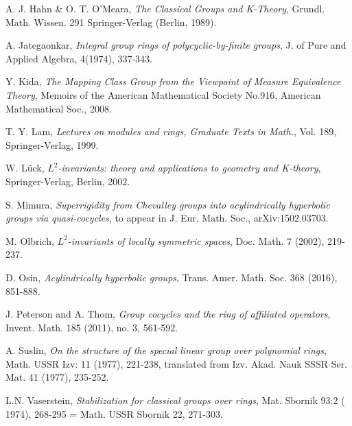 \documentclass{gtpart}     %
\begin{document}
\begin{thebibliography}{99}
 A. J. Hahn \& O. T. O'Meara, \textit{The Classical Groups and
K-Theory}, Grundl. Math. Wissen. 291 Springer-Verlag (Berlin, 1989).

 A. Jategaonkar, \textit{Integral group rings of
polycyclic-by-finite groups}, J. of Pure and Applied Algebra, 4(1974),
337-343.

 Y. Kida, \textit{The Mapping Class Group from the Viewpoint of
Measure Equivalence Theory}, Memoirs of the American Mathematical Society
No.916, American Mathematical Soc., 2008.

 T. Y. Lam, \textit{Lectures on modules and rings, Graduate
Texts in Math.}, Vol. 189, Springer-Verlag, 1999.

 W. L\"{u}ck, $L^{2}$\textit{-invariants: theory and
applications to geometry and K-theory}, Springer-Verlag, Berlin, 2002.

 S. Mimura, \textit{Superrigidity from Chevalley groups into
acylindrically hyperbolic groups via quasi-cocycles}, to appear in J. Eur.
Math. Soc., arXiv:1502.03703.

 M. Olbrich, $L^{2}$\textit{-invariants of locally symmetric
spaces}, Doc. Math. 7 (2002), 219-237.

 D. Osin, \textit{Acylindrically hyperbolic groups}, Trans.
Amer. Math. Soc. 368 (2016), 851-888.

 J. Peterson and A. Thom, \textit{Group cocycles and the ring of
affiliated operators}, Invent. Math. 185 (2011), no. 3, 561-592.

 A. Suslin, \textit{On the structure of the special linear group
over polynomial rings}, Math. USSR Izv: 11 (1977), 221-238, translated from
Izv. Akad. Nauk SSSR Ser. Mat. 41 (1977), 235-252.

 L.N. Vaserstein, \textit{Stabilization for classical groups
over rings}, Mat. Sbornik 93:2 ( 1974), 268-295 = Math. USSR Sbornik 22,
271-303.
\end{thebibliography}
\end{document}
